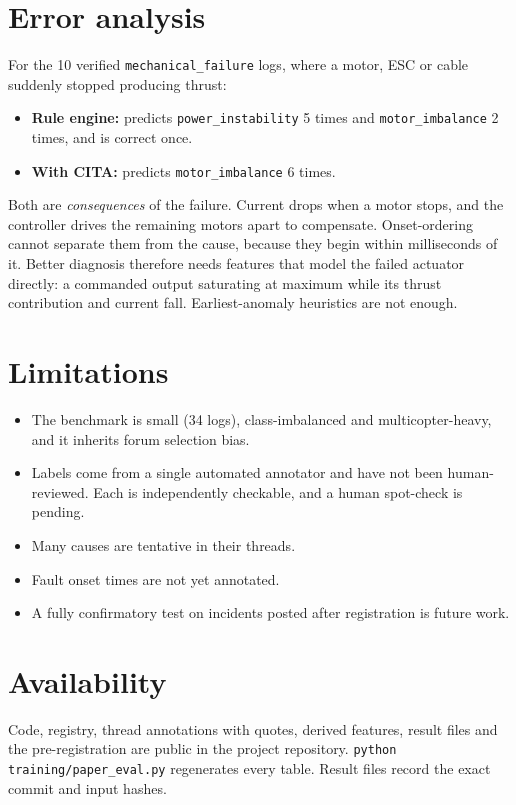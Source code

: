 \documentclass[10pt,a4paper]{article}
\begin{document}
\section{Error analysis}\label{sec:errors}
For the 10 verified \texttt{mechanical\_failure} logs, where a motor, ESC
or cable suddenly stopped producing thrust:
\begin{itemize}
\item \textbf{Rule engine:} predicts \texttt{power\_instability} 5 times and
      \texttt{motor\_imbalance} 2 times, and is correct once.
\item \textbf{With CITA:} predicts \texttt{motor\_imbalance} 6 times.
\end{itemize}
Both are \emph{consequences} of the failure. Current drops when a motor
stops, and the controller drives the remaining motors apart to compensate.
Onset-ordering cannot separate them from the cause, because they begin
within milliseconds of it. Better diagnosis therefore needs features that
model the failed actuator directly: a commanded output saturating at
maximum while its thrust contribution and current fall. Earliest-anomaly
heuristics are not enough.

\section{Limitations}
\begin{itemize}
\item The benchmark is small (34 logs), class-imbalanced and
      multicopter-heavy, and it inherits forum selection bias.
\item Labels come from a single automated annotator and have not been
      human-reviewed. Each is independently checkable, and a human
      spot-check is pending.
\item Many causes are tentative in their threads.
\item Fault onset times are not yet annotated.
\item A fully confirmatory test on incidents posted after registration is
      future work.
\end{itemize}

\section{Availability}
Code, registry, thread annotations with quotes, derived features, result
files and the pre-registration are public in the project repository.
\texttt{python training/paper\_eval.py} regenerates every table. Result
files record the exact commit and input hashes.



\end{document}
